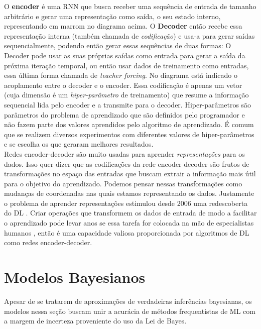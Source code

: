 O \textbf{encoder} é uma RNN que busca receber uma sequência de entrada de
tamanho arbitrário e gerar uma representação como saída, o seu estado interno,
representando em marrom no diagrama acima. O \textbf{Decoder} então recebe essa representação interna (também chamada
de \textit{codificação}) e usa-a para gerar saídas sequencialmente, podendo
então gerar essas sequências de duas formas: O Decoder pode usar as suas próprias saídas
como entrada para gerar a saída da próxima iteração temporal, ou então usar dados de treinamento como
entradas, essa última forma chamada de \textit{teacher forcing}. No diagrama
está indicado o acoplamento entre o decoder e o encoder. Essa codificação é apenas
um vetor (cuja dimensão é um \textit{hiper-parâmetro} de treinamento) que resume a
informação sequencial lida pelo encoder e a transmite para o decoder.
Hiper-parâmetros são parâmetros do problema de aprendizado que são definidos
pelo programador e não fazem parte dos valores aprendidos pelo algoritmo de
aprendizado. É comum que se realizem diversos experimentos com diferentes
valores de hiper-parâmetros e se escolha os que geraram melhores resultados. 
\\

Redes encoder-decoder são muito usadas para aprender \textit{representações} para os
dados. Isso quer dizer que as codificações da rede encoder-decoder são frutos de
transformações no espaço das entradas que buscam extrair a informação mais útil
para o objetivo do aprendizado. Podemos pensar nessas transformações como
mudanças de coordenadas nas quais estamos representando os dados. Justamente o problema de aprender
representações estimulou desde 2006 uma redescoberta do DL \citep{dlbook}. Criar
operações que transformem os dados de entrada de modo a facilitar o aprendizado
pode levar anos se essa tarefa for colocada na mão de especialistas humanos
\citep{dlbook}, então é uma capacidade valiosa proporcionada por algoritmos de
DL como redes encoder-decoder. \\



\section{Modelos Bayesianos}

Apesar de se tratarem de aproximações de verdadeiras inferências bayesianas, os
modelos nessa seção buscam unir a acurácia de métodos frequentistas de ML com a
margem de incerteza proveniente do uso da Lei de Bayes.

